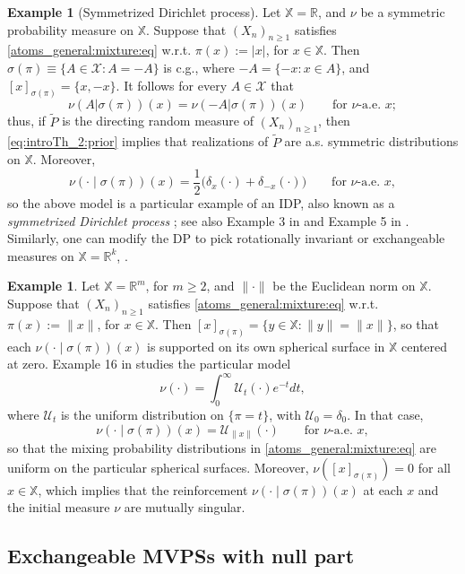 \documentclass[a4paper]{article}
\theoremstyle{plain}
\theoremstyle{remark}
\theoremstyle{definition}
\newtheorem{example}[theorem]{Example}
\begin{document}
\begin{example}[Symmetrized Dirichlet process]
Let $\mathbb{X}=\mathbb{R}$, and $\nu$ be a symmetric probability measure on $\mathbb{X}$. Suppose that $(X_n)_{n\geq1}$ satisfies \eqref{atoms_general:mixture:eq} w.r.t. $\pi(x):=|x|$, for $x\in\mathbb{X}$. Then $\sigma(\pi)\equiv\{A\in\mathcal{X}:A=-A\}$ is c.g., where $-A=\{-x:x\in A\}$, and $[x]_{\sigma(\pi)}=\{x,-x\}$. It follows for every $A\in\mathcal{X}$ that
\[\nu(A|\sigma(\pi))(x)=\nu(-A|\sigma(\pi))(x)\qquad\mbox{for }\nu\mbox{-a.e. }x;\]
thus, if $\tilde{P}$ is the directing random measure of $(X_n)_{n\geq1}$, then \eqref{eq:introTh_2:prior} implies that realizations of $\tilde{P}$ are a.s. symmetric distributions on $\mathbb{X}$. Moreover,
\[\nu(\cdot\mid\sigma(\pi))(x)=\frac{1}{2}\bigl(\delta_x(\cdot)+\delta_{-x}(\cdot)\bigr)\qquad\mbox{for }\nu\mbox{-a.e. }x,\]
so the above model is a particular example of an IDP, also known as a \textit{symmetrized Dirichlet process} \citep{doss1984}; see also Example 3 in \cite{berti2023kernel} and Example 5 in \cite{sariev2023sufficientness}. Similarly, one can modify the DP to pick rotationally invariant or exchangeable measures on $\mathbb{X}=\mathbb{R}^k$, \cite[Examples 4.34 and 4.35]{ghosal2017}.
\end{example}

\begin{example}
Let $\mathbb{X}=\mathbb{R}^m$, for $m\geq2$, and $\|\cdot\|$ be the Euclidean norm on $\mathbb{X}$. Suppose that $(X_n)_{n\geq1}$ satisfies \eqref{atoms_general:mixture:eq} w.r.t. $\pi(x):=\|x\|$, for $x\in\mathbb{X}$. Then $[x]_{\sigma(\pi)}=\{y\in\mathbb{X}:\|y\|=\|x\|\}$, so that each $\nu(\cdot\mid\sigma(\pi))(x)$ is supported on its own spherical surface in $\mathbb{X}$ centered at zero. Example 16 in \cite{berti2023kernel} studies the particular model 
\[\nu(\cdot)=\int_0^\infty\mathcal{U}_t(\cdot)e^{-t}dt,\]
where $\mathcal{U}_t$ is the uniform distribution on $\{\pi=t\}$, with $\mathcal{U}_0=\delta_0$. In that case,
\[\nu(\cdot\mid\sigma(\pi))(x)=\mathcal{U}_{\|x\|}(\cdot)\qquad\mbox{for }\nu\mbox{-a.e. }x,\]
so that the mixing probability distributions in \eqref{atoms_general:mixture:eq} are uniform on the particular spherical surfaces. Moreover, $\nu([x]_{\sigma(\pi)})=0$ for all $x\in\mathbb{X}$, which implies that the reinforcement $\nu(\cdot\mid\sigma(\pi))(x)$ at each $x$ and the initial measure $\nu$ are mutually singular.
\end{example}

\subsection{Exchangeable MVPSs with null part}\label{section:results:null}
\end{document}
